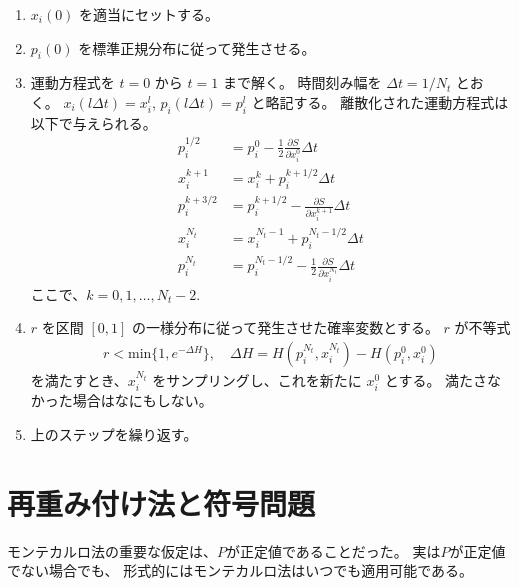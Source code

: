 \documentclass[]{ltjsarticle}
\begin{document}
\begin{enumerate}
    \item $x_i(0)$ を適当にセットする。
    \item $p_i(0)$ を標準正規分布に従って発生させる。
    \item 運動方程式を $t=0$ から $t=1$ まで解く。
        時間刻み幅を $\Delta t = 1/N_t$ とおく。
        $x_i(l\Delta t) = x_i^{l}$, $p_i(l\Delta t) =p_i^{l}$ と略記する。
        離散化された運動方程式は以下で与えられる。
        \begin{align}
            p_i^{1/2} &= p_i^0 - \frac{1}{2}\frac{\partial S}{\partial x_i^0} \Delta t \\
            x_i^{k+1} &= x_i^k + p_i^{k+1/2} \Delta t \\
            p_i^{k+3/2} &= p_i^{k+1/2} - \frac{\partial S}{\partial x_i^{k+1}} \Delta t \\
            x_i^{N_t} &= x_i^{N_t-1} + p_i^{N_t-1/2} \Delta t \\
            p_i^{N_t} &= p_i^{N_t-1/2} - \frac{1}{2}\frac{\partial S}{\partial x_i^{N_t}} \Delta t
        \end{align}    
        ここで、$k = 0,1,\dots,N_t-2$.    
    \item $r$ を区間 $[0,1]$ の一様分布に従って発生させた確率変数とする。
        $r$ が不等式    
        \begin{align}
            r < \mathrm{min}\{ 1, e^{-\Delta H}\}, \quad 
            \Delta H = 
            H(p_i^{N_t},x_i^{N_t})-H(p_i^0,x_i^0)
        \end{align}
        を満たすとき、$x_i^{N_t}$ をサンプリングし、これを新たに $x_i^0$ とする。
        満たさなかった場合はなにもしない。    
    \item 上のステップを繰り返す。
\end{enumerate}



\section{再重み付け法と符号問題}
モンテカルロ法の重要な仮定は、$P$が正定値であることだった。
実は$P$が正定値でない場合でも、
形式的にはモンテカルロ法はいつでも適用可能である。
\end{document}
